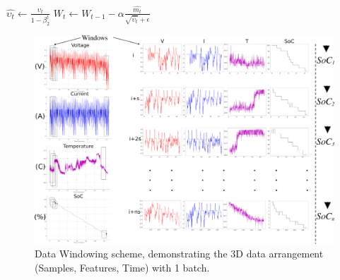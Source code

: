{\begin{algorithm}
\begin{algorithmic}[1]
        \STATE $\hat{\upsilon_t} \gets \frac{\upsilon_t}{1-\beta^t_2} $ 
        \STATE $W_t \gets W_{t-1}- \alpha \frac{\hat{m_t}}{\sqrt{\hat{\upsilon_t}}+\epsilon} $ 
        \ENDWHILE
    \end{algorithmic}
    \label{alg:copyAdam}
\end{algorithm}
\begin{table}[htbp]
    \renewcommand{\arraystretch}{1.3}
    \caption{Optimiser Hyper-Parameters}
    \centering
    \label{tab:newM-params}
\end{table}}
\begin{landscape}
    \begin{figure}[t]
        \centering
        \includegraphics[width=\linewidth]{II_Body/images/Windowing4f-A3.jpg}
        \caption{Data Windowing scheme, demonstrating the 3D data arrangement (Samples, Features, Time) with 1 batch.}
        \label{fig:Windowing}
    \end{figure}
\end{landscape}